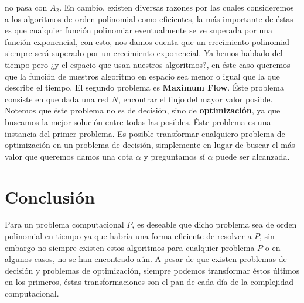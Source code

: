 \documentclass{article}
\begin{document}
no pasa con \(A_{2}\). En cambio, existen diversas razones por las cuales consideremos a los algoritmos de orden polinomial como 
eficientes, la más importante de éstas es que cualquier función polinomiar eventualmente se ve superada por una función exponencial, con esto, 
nos damos cuenta que un crecimiento polinomial siempre será superado por un crecimiento exponencial. Ya hemos hablado del tiempo 
pero ¿y el espacio que usan nuestros algoritmos?, en éste caso queremos que la función de nuestros algoritmo en espacio sea menor o igual 
que la que describe el tiempo.
\newline 
El segundo problema es \textbf{Maximum Flow}.
\newline 
Éste problema consiste en que dada una red \(N\), encontrar el flujo del mayor valor posible. Notemos que éste problema no es de decisión, sino de 
\textbf{optimización}, ya que buscamos la mejor solución entre todas las posibles. Éste problema es una instancia del primer problema.
\newline 
Es posible transformar cualquiero problema de optimización en un problema de decisión, simplemente en lugar de buscar el más valor que queremos damos 
una cota \(\alpha\) y preguntamos sí \(\alpha\) puede ser alcanzada. 

\section{Conclusión}
\noindent
Para un problema computacional \(P\), es deseable que dicho problema sea de orden polinomial en tiempo ya que habría una forma eficiente de 
resolver a \(P\), sin embargo no siempre existen estos algoritmos para cualquier problema \(P\) o en algunos casos, no se han encontrado aún. 
A pesar de que existen problemas de decisión y problemas de optimización, siempre podemos transformar éstos últimos en los primeros, éstas transformaciones 
son el pan de cada día de la complejidad computacional.
\end{document}
